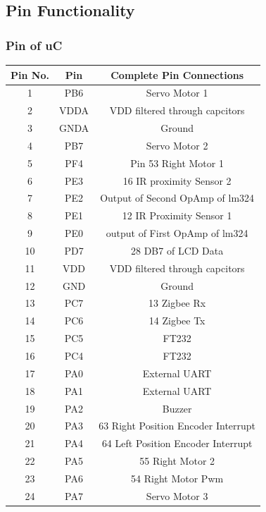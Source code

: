 \documentclass[a4paper,10pt,oneside]{article}
\begin{document}
{\begin{center}
	\end{center}
	\subsection{\huge \textbf{Pin Functionality}}
		\subsubsection{\Large\textbf{Pin of uC}}
			\begin{longtable}{|c|c|c|}\hline
				Pin No.&Pin & 	Complete Pin Connections\\ \hline
				1 &		PB6	&	Servo Motor 1\\ \hline
				2 &		VDDA&	VDD filtered through capcitors\\ \hline
				3 &		GNDA&	Ground\\ \hline
				4 &		PB7 &	Servo Motor 2\\ \hline
				5 & 	PF4 &	Pin 53 Right Motor 1\\ \hline
				6 &		PE3	&	16 IR proximity Sensor 2\\ \hline
				7 &		PE2 &	Output of Second OpAmp of lm324\\ \hline
				8 &		PE1 &	12 IR Proximity Sensor 1 \\ \hline
				9 &		PE0 &	output of First OpAmp of lm324\\ \hline
				10 &	PD7 &	28 DB7 of LCD Data\\ \hline
				11 &	VDD &	VDD filtered through capcitors\\ \hline
				12 &	GND	 &	Ground\\ \hline
				13 &	PC7	 &	13 Zigbee Rx\\ \hline
				14 &	PC6	 &	14 Zigbee Tx\\ \hline
				15 & 	PC5	 &	FT232\\ \hline
				16 & 	PC4 &	FT232\\ \hline 
				17 &	PA0 &	External UART\\ \hline
				18 &	PA1 &	External UART\\ \hline
				19 &	PA2 &	Buzzer\\ \hline
				20 &	PA3 &	63 Right Position Encoder Interrupt\\ \hline
				21 &	PA4	 &	64 Left Position Encoder Interrupt\\ \hline
				22 &	PA5 &	55 Right Motor 2\\ \hline
				23 &	PA6 &	54 Right Motor Pwm\\ \hline
				24 &	PA7 &	Servo Motor 3\\ \hline

\end{longtable}}
\end{document}
